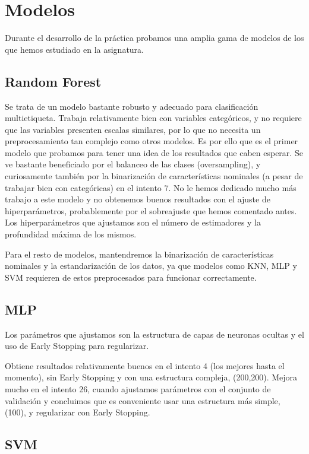 \documentclass{article}
\begin{document}
\pagebreak

\section{Modelos}

Durante el desarrollo de la práctica probamos una amplia gama de
modelos de los que hemos estudiado en la asignatura.

\subsection{Random Forest}

Se trata de un modelo bastante robusto y adecuado para clasificación
multietiqueta. Trabaja relativamente bien con variables categóricos, y
no requiere que las variables presenten escalas similares, por lo que
no necesita un preprocesamiento tan complejo como otros modelos. Es
por ello que es el primer modelo que probamos para tener una idea de
los resultados que caben esperar. Se ve bastante beneficiado por el
balanceo de las clases (oversampling), y curiosamente también por la
binarización de características nominales (a pesar de trabajar bien
con categóricas) en el intento 7. No le hemos dedicado mucho más
trabajo a este modelo y no obtenemos buenos resultados con el ajuste
de hiperparámetros, probablemente por el sobreajuste que hemos
comentado antes. Los hiperparámetros que ajustamos son el número de
estimadores y la profundidad máxima de los mismos.

Para el resto de modelos, mantendremos la binarización de
características nominales y la estandarización de los datos, ya que
modelos como KNN, MLP y SVM requieren de estos preprocesados para
funcionar correctamente.

\subsection{MLP}

Los parámetros que ajustamos son la estructura de capas de neuronas
ocultas y el uso de Early Stopping para regularizar.

Obtiene resultados relativamente buenos en el intento 4 (los mejores
hasta el momento), sin Early Stopping y con una estructura compleja,
(200,200). Mejora mucho en el intento 26, cuando ajustamos parámetros
con el conjunto de validación y concluimos que es conveniente usar una estructura más simple, (100), y regularizar con Early Stopping.

\subsection{SVM}
\end{document}
